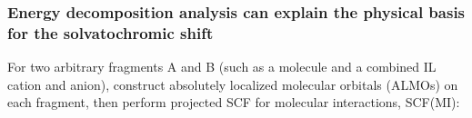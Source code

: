 \documentclass[%
    xcolor=usenames,dvipsnames,svgnames%
]{beamer}
\begin{document}
\begin{frame}
  \frametitle{Energy decomposition analysis can explain the physical basis for the solvatochromic shift}
  For two arbitrary fragments A and B (such as a  molecule and a combined IL cation and anion), construct \alert{absolutely localized molecular orbitals} (ALMOs) on each fragment, then perform projected SCF for molecular interactions, SCF(MI):
  \begin{table}
    \centering
    \begin{tabular}{ccc}

\end{tabular}
\end{table}
\end{frame}
\end{document}
